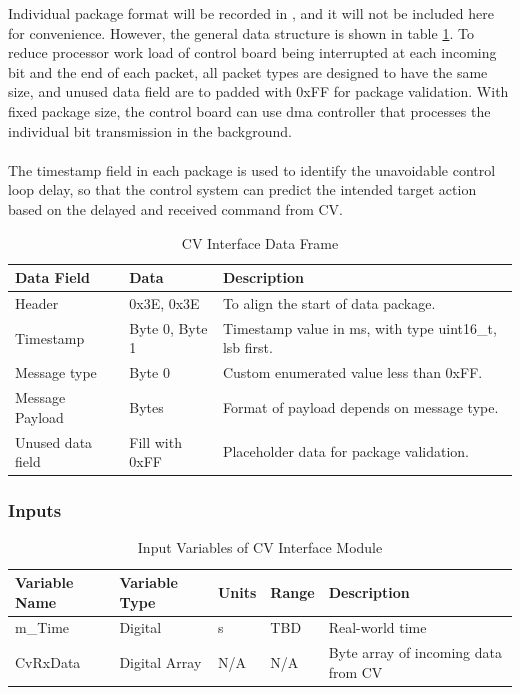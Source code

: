 \documentclass[12pt]{article}
\begin{document}
            Individual package format will be recorded in \cite{CvInterfaceGit2023}, and it will not be included here for convenience. However, the general data structure is shown in table \ref{tbl:CV Interface Data Frame}. To reduce processor work load of control board being interrupted at each incoming bit and the end of each packet, all packet types are designed to have the same size, and unused data field are to padded with 0xFF for package validation. With fixed package size, the control board can use \acrshort{dma} controller that processes the individual bit transmission in the background.\\\\
            The timestamp field in each package is used to identify the unavoidable control loop delay, so that the control system can predict the intended target action based on the delayed and received command from CV.
            \begin{table}[H]
                \begin{tabular}{|p{}|p{}|p{}|}
                    \hline Data Field  & Data & Description \\
                    \hline Header & 0x3E, 0x3E & To align the start of data package. \\
                    \hline Timestamp & Byte 0, Byte 1 & Timestamp value in ms, with type uint16\_t, \acrshort{lsb} first. \\
                    \hline Message type & Byte 0 & Custom enumerated value less than 0xFF. \\
                    \hline Message Payload & Bytes & Format of payload depends on message type. \\
                    \hline Unused data field & Fill with 0xFF & Placeholder data for package validation. \\
                    \hline
                \end{tabular}
                \caption{CV Interface Data Frame} \label{tbl:CV Interface Data Frame}
            \end{table}
            
         \subsubsection{Inputs}
             \begin{table}[H]
              \centering
                \caption{Input Variables of CV Interface Module} \label{tbl:Input Variables of CV Interface Module}
                \begin{tabularx}{\textwidth}{|p{5cm}|p{2cm}|p{1.2cm}|p{1cm}|X|}
                \hline Variable Name & Variable Type & Units & Range & Description \\
                \hline m\_Time & Digital & \unit{\second}  & TBD & Real-world time\\
                \hline CvRxData & Digital Array & N/A  & N/A & Byte array of incoming data from CV\\
                \hline 
              \end{tabularx}
            \end{table}
        
\end{document}
